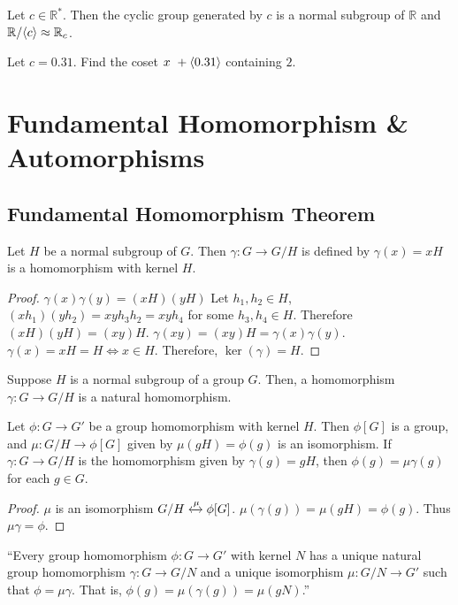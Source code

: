 \begin{remark}
	Let $c \in \mathbb{R}^*$.
	Then the cyclic group generated by $c$ is
	a normal subgroup of $\mathbb{R}$ and $\mathbb{R}/\langle c\rangle\approx \mathbb{R}_c$.
\end{remark}

\begin{question}
	Let $c = 0.31$.
	Find the coset $x\ +\langle 0.31\rangle$ containing $2$.
\end{question}

\section{Fundamental Homomorphism \& Automorphisms}
\subsection{Fundamental Homomorphism Theorem}
\begin{theorem}
	Let $H$ be a normal subgroup of $G$.
	Then $\gamma : G \to G/H$ is defined by
	$\gamma(x) = xH$  is a homomorphism with kernel $H$.
\end{theorem}
\begin{proof}
	$\gamma(x)\gamma(y) = (xH)(yH)$
	Let $h_1,h_2 \in H$, $(xh_1)(yh_2) = xyh_3h_2 = xyh_4$ for some $h_3,h_4 \in H$.
	Therefore $(xH)(yH) = (xy)H$.
	$\gamma(xy) = (xy)H = \gamma(x)\gamma(y)$.
	$\gamma(x) = xH = H \iff x \in H$.
	Therefore, $\ker(\gamma) = H$.
\end{proof}

\begin{remark}
	Suppose $H$ is a normal subgroup of a group $G$.
	Then, a homomorphism $\gamma : G \to G/H$ is a natural homomorphism.
\end{remark}

\begin{theorem}
	Let $\phi : G \to G'$ be a group homomorphism with kernel $H$.
	Then $\phi[G]$ is a group, and $\mu : G/H \to \phi[G]$ given by $\mu(gH) = \phi(g)$ is an isomorphism.
	If $\gamma : G \to G/H$ is the homomorphism given by $\gamma(g) = gH$, then $\phi(g) = \mu\gamma(g)$ for each $g \in G$.
\end{theorem}
\begin{proof}
	$\mu$ is an isomorphism $G/H \xleftrightarrow{\mu}\phi[G]$.
	$\mu(\gamma(g)) = \mu(gH) = \phi(g)$.
	Thus $\mu\gamma = \phi$.
\end{proof}
\begin{commentary}
	``Every group homomorphism $\phi : G \to G'$ with kernel $N$ has a unique natural group homomorphism $\gamma : G \to G/N$ and a unique isomorphism $\mu : G/N \to G'$ such that $\phi = \mu\gamma$. That is, $\phi(g) = \mu(\gamma(g)) = \mu(gN)$.''
\end{commentary}


